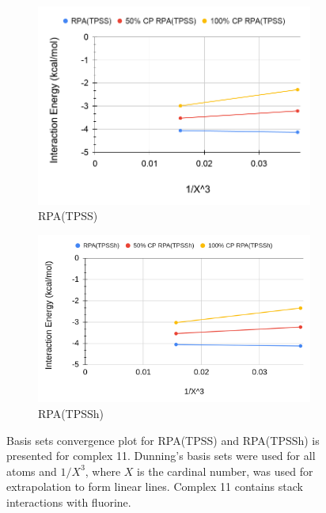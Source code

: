 \documentclass[11pt]{article}
\begin{document}
\begin{figure}[hbpt]
  \centering
  \begin{subfigure}{.5\textwidth}
    \centering
    \includegraphics[scale=0.3]{tpss-11.png}
    \caption{RPA(TPSS)}
    \label{fig:tpss11}
  \end{subfigure}%
  \begin{subfigure}{.5\textwidth}
    \centering
    \includegraphics[scale=0.18]{tpssh-11.png}
    \caption{RPA(TPSSh)}
    \label{fig:tpssh_11}
  \end{subfigure}
  \caption{Basis sets convergence plot for RPA(TPSS) and RPA(TPSSh) is
    presented for complex 11. Dunning's basis sets were used for all
    atoms and $1/X^3$, where $X$ is the cardinal number, was used for
    extrapolation to form linear lines. Complex 11 contains stack
    interactions with fluorine.}
  \label{fig:complex_11}
\end{figure}
\end{document}
